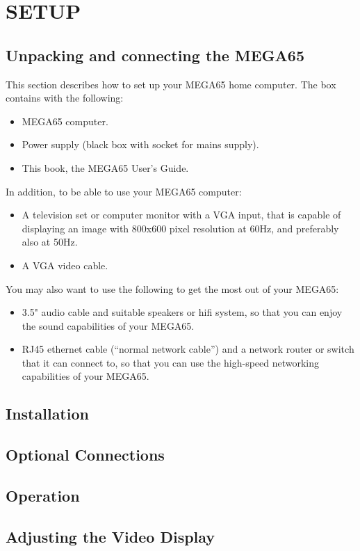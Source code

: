 \chapter{SETUP}
\section{Unpacking and connecting the MEGA65}

This section describes how to set up your MEGA65 home computer.
The box contains with the following:
\begin{itemize}
\item MEGA65 computer.
\item Power supply (black box with socket for mains supply).
\item This book, the MEGA65 User's Guide.
\end{itemize}

In addition, to be able to use your MEGA65 computer:
\begin{itemize}
\item A television set or computer monitor with a VGA input, that is capable of displaying an image with 800x600 pixel resolution at 60Hz, and preferably also at 50Hz.
\item A VGA video cable.
\end{itemize}

You may also want to use the following to get the most out of your MEGA65:
\begin{itemize}
\item 3.5" audio cable and suitable speakers or hifi system, so that you can enjoy the sound capabilities of your MEGA65.
\item RJ45 ethernet cable (``normal network cable'') and a network router or switch that it can connect to, so that you can use the high-speed networking capabilities of your MEGA65.
\end{itemize}

\section{Installation}

\section{Optional Connections}

\section{Operation}

\section{Adjusting the Video Display}
